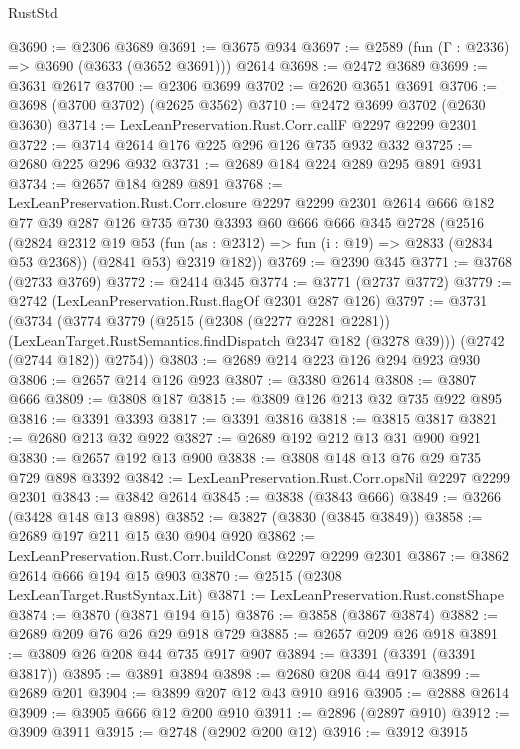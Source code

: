 \begin{lexlean}{RustStd}
\begin{coremodule}
@3690 := @2306 @3689
@3691 := @3675 @934
@3697 := @2589 (fun (Γ : @2336) => @3690 (@3633 (@3652 @3691))) @2614
@3698 := @2472 @3689
@3699 := @3631 @2617
@3700 := @2306 @3699
@3702 := @2620 @3651 @3691
@3706 := @3698 (@3700 @3702) (@2625 @3562)
@3710 := @2472 @3699 @3702 (@2630 @3630)
@3714 := LexLeanPreservation.Rust.Corr.callF @2297 @2299 @2301
@3722 := @3714 @2614 @176 @225 @296 @126 @735 @932 @332
@3725 := @2680 @225 @296 @932
@3731 := @2689 @184 @224 @289 @295 @891 @931
@3734 := @2657 @184 @289 @891
@3768 := LexLeanPreservation.Rust.Corr.closure
    @2297
    @2299
    @2301
    @2614
    @666
    @182
    @77
    @39
    @287
    @126
    @735
    @730
    @3393
    @60
    @666
    @666
    @345
    @2728
    (@2516
      (@2824
        @2312
        @19
        @53
        (fun (as : @2312) => fun (i : @19) => @2833 (@2834 @53 @2368))
        (@2841 @53)
        @2319
        @182))
@3769 := @2390 @345
@3771 := @3768 (@2733 @3769)
@3772 := @2414 @345
@3774 := @3771 (@2737 @3772)
@3779 := @2742 (LexLeanPreservation.Rust.flagOf @2301 @287 @126)
@3797 := @3731
    (@3734
      (@3774
        @3779
        (@2515
          (@2308 (@2277 @2281 @2281))
          (LexLeanTarget.RustSemantics.findDispatch @2347 @182 (@3278 @39)))
        (@2742 (@2744 @182))
        @2754))
@3803 := @2689 @214 @223 @126 @294 @923 @930
@3806 := @2657 @214 @126 @923
@3807 := @3380 @2614
@3808 := @3807 @666
@3809 := @3808 @187
@3815 := @3809 @126 @213 @32 @735 @922 @895
@3816 := @3391 @3393
@3817 := @3391 @3816
@3818 := @3815 @3817
@3821 := @2680 @213 @32 @922
@3827 := @2689 @192 @212 @13 @31 @900 @921
@3830 := @2657 @192 @13 @900
@3838 := @3808 @148 @13 @76 @29 @735 @729 @898 @3392
@3842 := LexLeanPreservation.Rust.Corr.opsNil @2297 @2299 @2301
@3843 := @3842 @2614
@3845 := @3838 (@3843 @666)
@3849 := @3266 (@3428 @148 @13 @898)
@3852 := @3827 (@3830 (@3845 @3849))
@3858 := @2689 @197 @211 @15 @30 @904 @920
@3862 := LexLeanPreservation.Rust.Corr.buildConst @2297 @2299 @2301
@3867 := @3862 @2614 @666 @194 @15 @903
@3870 := @2515 (@2308 LexLeanTarget.RustSyntax.Lit)
@3871 := LexLeanPreservation.Rust.constShape
@3874 := @3870 (@3871 @194 @15)
@3876 := @3858 (@3867 @3874)
@3882 := @2689 @209 @76 @26 @29 @918 @729
@3885 := @2657 @209 @26 @918
@3891 := @3809 @26 @208 @44 @735 @917 @907
@3894 := @3391 (@3391 (@3391 @3817))
@3895 := @3891 @3894
@3898 := @2680 @208 @44 @917
@3899 := @2689 @201
@3904 := @3899 @207 @12 @43 @910 @916
@3905 := @2888 @2614
@3909 := @3905 @666 @12 @200 @910
@3911 := @2896 (@2897 @910)
@3912 := @3909 @3911
@3915 := @2748 (@2902 @200 @12)
@3916 := @3912 @3915

\end{coremodule}
\end{lexlean}
